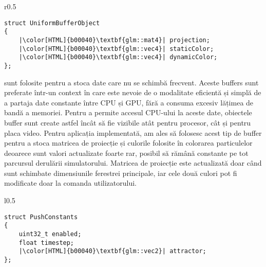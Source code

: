 \vspace{1em}
\begin{wrapfigure}{r}{0.5\textwidth}
\vspace{-1em}
\hspace{1.2cm}
\begin{minipage}{\linewidth}
\begin{verbatim}
struct UniformBufferObject
{
    |\color[HTML]{b00040}\textbf{glm::mat4}| projection;
    |\color[HTML]{b00040}\textbf{glm::vec4}| staticColor;
    |\color[HTML]{b00040}\textbf{glm::vec4}| dynamicColor;
};
\end{verbatim}
\end{minipage}
\vspace{-1em}
\end{wrapfigure}

 sunt folosite pentru a stoca date care nu se schimbă frecvent. Aceste buffers sunt preferate într-un context în care este nevoie de o modalitate eficientă și simplă de a partaja date constante între CPU și GPU, fără a consuma excesiv lățimea de bandă a memoriei. Pentru a permite accesul CPU-ului la aceste date, obiectele buffer sunt create astfel încât să fie vizibile atât pentru procesor, cât și pentru placa video. Pentru aplicația implementată, am ales să folosesc acest tip de buffer pentru a stoca matricea de proiecție și culorile folosite în colorarea particulelor deoarece sunt valori actualizate foarte rar, posibil să rămână constante pe tot parcursul derulării simulatorului. Matricea de proiecție este actualizată doar când sunt schimbate dimensiunile ferestrei principale, iar cele două culori pot fi modificate doar la comanda utilizatorului. 

\vspace{1em}
\begin{wrapfigure}{l}{0.5\textwidth}
\vspace{-1em}
\hspace{1.5cm}
\begin{minipage}{\linewidth}
\begin{verbatim}
struct PushConstants
{
    uint32_t enabled;
    float timestep;
    |\color[HTML]{b00040}\textbf{glm::vec2}| attractor;
};
\end{verbatim}
\end{minipage}
\vspace{-1em}
\end{wrapfigure}

